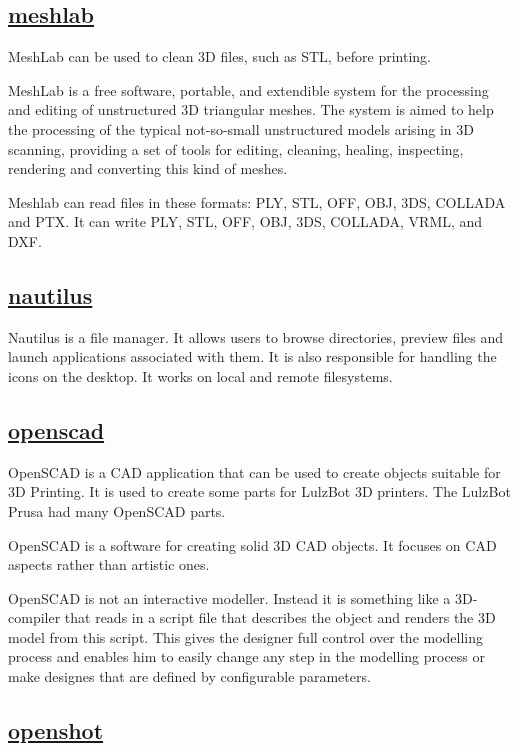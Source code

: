 \subsection{\href{http://meshlab.sourceforge.net/}{meshlab}}

MeshLab can be used to clean 3D files, such as STL, before printing.

 MeshLab is a free software, portable, and extendible system for the
 processing and editing of unstructured 3D triangular meshes.
 The system is aimed to help the processing of the typical not-so-small
 unstructured models arising in 3D scanning, providing a set of tools for
 editing, cleaning, healing, inspecting, rendering and converting this kind
 of meshes.
 
 Meshlab can read files in these formats: PLY, STL, OFF, OBJ, 3DS, COLLADA
 and PTX. It can write PLY, STL, OFF, OBJ, 3DS, COLLADA, VRML, and DXF.

\subsection{\href{http://www.gnome.org/projects/nautilus/}{nautilus}}

 Nautilus is a file manager. It allows users
 to browse directories, preview files and launch applications associated
 with them. It is also responsible for handling the icons on the
 desktop. It works on local and remote filesystems.
 
\subsection{\href{http://openscad.org/}{openscad}}

OpenSCAD is a CAD application that can be used to create objects suitable for
3D Printing. It is used to create some parts for LulzBot 3D printers. The
LulzBot Prusa had many OpenSCAD parts.

 OpenSCAD is a software for creating solid 3D CAD objects. It focuses on CAD
 aspects rather than artistic ones.
 
 OpenSCAD is not an interactive modeller. Instead it is something like a
 3D-compiler that reads in a script file that describes the object and renders
 the 3D model from this script. This gives the designer full control over the
 modelling process and enables him to easily change any step in the modelling
 process or make designes that are defined by configurable parameters.

\subsection{\href{http://www.openshotvideo.com/}{openshot}}

